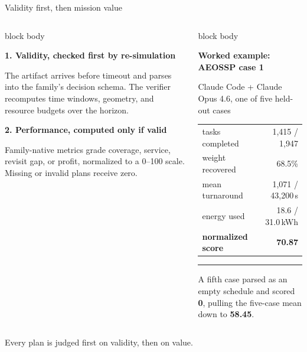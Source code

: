 \documentclass[aspectratio=169,11pt]{beamer}
\newcommand{\cardtitle}[2][abnavy]{{\small\bfseries\color{#1}#2\par}\vspace{0.15em}}
\begin{document}
\begin{frame}{Validity first, then mission value}
  \begin{columns}[T]
      \begin{beamercolorbox}[rounded=true,sep=0.6em]{block body}
        \begin{minipage}[t][5.85cm][c]{\dimexpr\linewidth-1.2em\relax}
        \cardtitle{1. Validity, checked first by re-simulation}
        {\small\raggedright The artifact arrives before timeout and parses into the family's decision schema. The verifier recomputes time windows, geometry, and resource budgets over the horizon.\par}
        \vspace{0.7em}
        \cardtitle{2. Performance, computed only if valid}
        {\small\raggedright Family-native metrics grade coverage, service, revisit gap, or profit, normalized to a 0--100 scale. Missing or invalid plans receive zero.\par}
        \end{minipage}
      \end{beamercolorbox}
      \begin{beamercolorbox}[rounded=true,sep=0.7em]{block body}
        \begin{minipage}[t][5.85cm][c]{\dimexpr\linewidth-1.4em\relax}
        \cardtitle{Worked example: AEOSSP case 1}
        {\footnotesize\color{abgray} Claude Code + Claude Opus 4.6, one of five held-out cases\par}
        \vspace{0.3em}
        {\scriptsize
        \begin{tabular}{@{}l r@{}}
        tasks completed & 1,415 / 1,947 \\
        weight recovered & 68.5\% \\
        mean turnaround & 1,071 / 43,200\,s \\
        energy used & 18.6 / 31.0\,kWh \\
        \midrule
        \textbf{normalized score} & \textbf{70.87} \\
        \end{tabular}\par}
        \vspace{0.4em}
        {\color{abgray!40}\rule{\linewidth}{0.4pt}}
        \vspace{0.4em}
        {\footnotesize\raggedright A fifth case parsed as an empty schedule and scored \textcolor{abred}{\textbf{0}}, pulling the five-case mean down to \textbf{58.45}.\par}
        \end{minipage}
      \end{beamercolorbox}
  \end{columns}
  \vspace{0.2em}
  \centering
  {\footnotesize\color{abgray} Every plan is judged first on validity, then on value.}
\end{frame}
\end{document}

